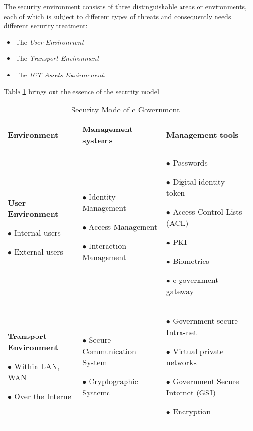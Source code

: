 The security environment consists of three distinguishable areas or environments,
each of which is subject to different types of threats and consequently needs different
security treatment:
\begin{itemize}
	\item The \textit{User Environment}
	\item The \textit{Transport Environment}
	\item The \textit{ICT Assets Environment}.
\end{itemize}
 
 Table {\ref{tab:security-model}} brings out the essence of the security model
 \begin{landscape}
 \begin{table}[ht]
 	\caption{Security Mode of e-Government.}\label{tab:security-model}
 	\begin{tabular}{p{5.5cm}p{5.5cm}p{5.5cm}}
 		\toprule
 		\textbf{Environment}                                                                    & \textbf{Management systems}                                                                              & \textbf{Management tools}                                                                                                                                                         \\ \midrule
 		{\bfseries User Environment\par}{$\bullet$ Internal users\par $\bullet$ External users} & {$\bullet$ Identity Management\par $\bullet$ Access Management\par $\bullet$ Interaction Management} & {$\bullet$ Passwords\par $\bullet$ Digital identity token\par $\bullet$ Access Control Lists (ACL)\par $\bullet$ PKI\par $\bullet$ Biometrics\par $\bullet$ e-government gateway} \\ \hline
 		
 		{\bfseries Transport Environment\par}{$\bullet$ Within LAN, WAN\par $\bullet$ Over the Internet} & {$\bullet$ Secure Communication System\par $\bullet$ Cryptographic Systems\par} & {$\bullet$ Government secure Intra-net\par $\bullet$ Virtual private networks\par $\bullet$ Government Secure Internet (GSI)\par $\bullet$ Encryption} \\ \hline
 		

\end{tabular}
\end{table}
\end{landscape}
